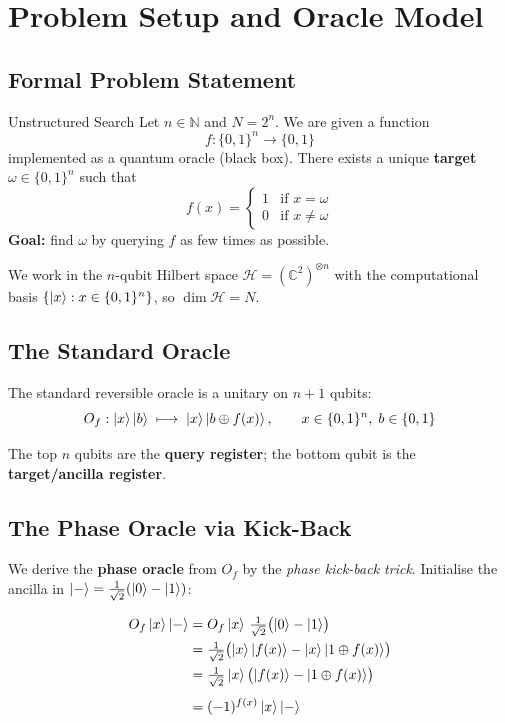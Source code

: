 \documentclass[12pt,a4paper]{article}
\begin{document}
\section{Problem Setup and Oracle Model}
\label{sec:setup}

\subsection{Formal Problem Statement}

\begin{defbox}{Unstructured Search}
Let $n \in \mathbb{N}$ and $N = 2^n$. We are given a function
\[
  f : \{0,1\}^n \longrightarrow \{0,1\}
\]
implemented as a quantum oracle (black box). There exists a unique \textbf{target} $\omega \in \{0,1\}^n$ such that
\[
  f(x) = \begin{cases} 1 & \text{if } x = \omega \\ 0 & \text{if } x \neq \omega \end{cases}
\]
\textbf{Goal:} find $\omega$ by querying $f$ as few times as possible.
\end{defbox}

We work in the $n$-qubit Hilbert space $\mathcal{H} = (\mathbb{C}^2)^{\otimes n}$ with the computational basis $\{\ket{x} : x \in \{0,1\}^n\}$, so $\dim \mathcal{H} = N$.

\subsection{The Standard Oracle}

The standard reversible oracle is a unitary on $n+1$ qubits:
\[
  O_f : \ket{x}\ket{b} \;\longmapsto\; \ket{x}\ket{b \oplus f(x)}, \qquad x \in \{0,1\}^n,\; b \in \{0,1\}
\]

The top $n$ qubits are the \textbf{query register}; the bottom qubit is the \textbf{target/ancilla register}.

\subsection{The Phase Oracle via Kick-Back}
\label{ssec:phasekickback}

We derive the \textbf{phase oracle} from $O_f$ by the \emph{phase kick-back trick}. Initialise the ancilla in $\ket{-} = \tfrac{1}{\sqrt{2}}(\ket{0}-\ket{1})$:

\begin{align}
  O_f\ket{x}\ket{-}
  &= O_f\ket{x}\,\tfrac{1}{\sqrt{2}}\bigl(\ket{0}-\ket{1}\bigr) \notag\\
  &= \tfrac{1}{\sqrt{2}}\bigl(\ket{x}\ket{f(x)} - \ket{x}\ket{1\oplus f(x)}\bigr) \notag\\
  &= \tfrac{1}{\sqrt{2}}\ket{x}\bigl(\ket{f(x)}-\ket{1\oplus f(x)}\bigr) \notag\\[4pt]
  &= (-1)^{f(x)}\ket{x}\ket{-} \label{eq:kickback}
\end{align}
\end{document}
